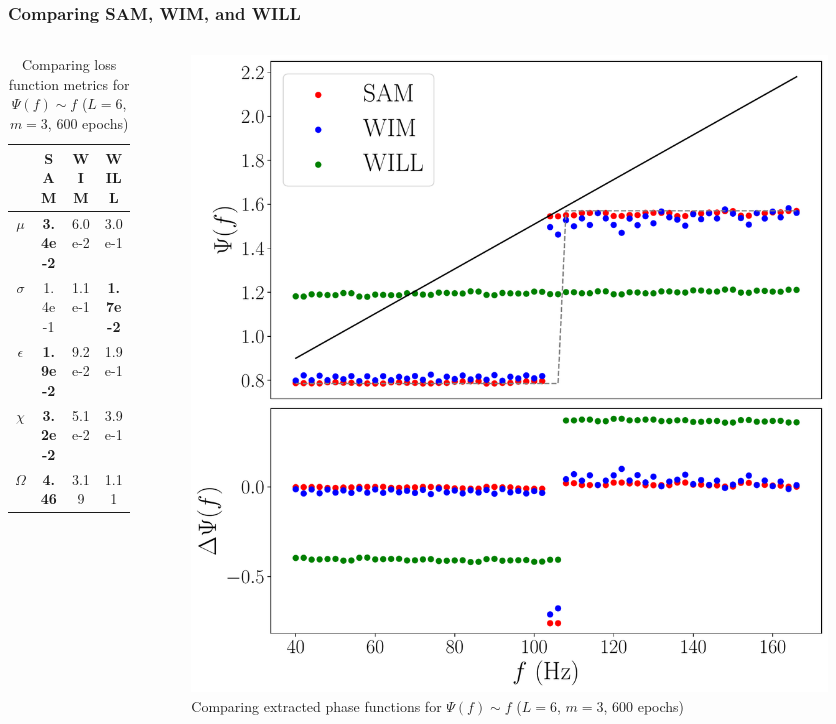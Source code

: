 \documentclass{beamer}
\begin{document}
\begin{frame}
\frametitle{Comparing SAM, WIM, and WILL}
\begin{columns}
\begin{column}{0.5\textwidth}
\begin{table}
\begin{tabular}{c || c| c| c }
& SAM & WIM & WILL \\ \hline \hline 
$\mu$ &  \textbf{3.4e-2} & 6.0e-2 & 3.0e-1 \\
$\sigma$ &  1.4e-1 &1.1e-1 & \textbf{ 1.7e-2}\\
$\epsilon$  &  \textbf{1.9e-2} & 9.2e-2 & 1.9e-1\\
$\chi$ & \textbf{ 3.2e-2} & 5.1e-2  & 3.9e-1  \\ \hline 
$\Omega$ &  \textbf{4.46} & 3.19 & 1.11
\end{tabular}
\caption{Comparing loss function metrics for $\Psi(f) \sim f$ ($L=6$, $m=3$, 600 epochs)}
\end{table}
\end{column}
\begin{column}{0.5\textwidth}
\begin{figure}
\centering 
\includegraphics[width=\textwidth]{im/SAM_WIM_WILL_F}
\caption{Comparing extracted phase functions for $\Psi(f) \sim f$ ($L=6$, $m=3$, 600 epochs)}
\end{figure}
\end{column}
\end{columns}
\end{frame}
\end{document}

